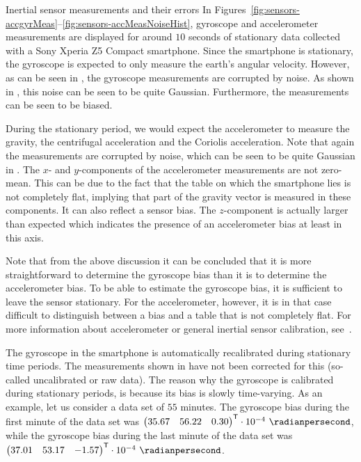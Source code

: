 \begin{myexample}{Inertial sensor measurements and their errors}%
\label{ex:sensors-inertialMeasurements}%
In Figures~\ref{fig:sensors-accgyrMeas}--\ref{fig:sensors-accMeasNoiseHist}, gyroscope and accelerometer measurements are displayed for around $10$ seconds of stationary data collected with a Sony Xperia Z5 Compact smartphone. Since the smartphone is stationary, the gyroscope is expected to only measure the earth's angular velocity. However, as can be seen in , the gyroscope measurements are corrupted by noise. As shown in , this noise can be seen to be quite Gaussian. Furthermore, the measurements can be seen to be biased. 

During the stationary period, we would expect the accelerometer to measure the gravity, the centrifugal acceleration and the Coriolis acceleration. Note that again the measurements are corrupted by noise, which can be seen to be quite Gaussian in . The $x$- and $y$-components of the accelerometer measurements are not zero-mean. This can be due to the fact that the table on which the smartphone lies is not completely flat, implying that part of the gravity vector is measured in these components. It can also reflect a sensor bias. The $z$-component is actually larger than expected which indicates the presence of an accelerometer bias at least in this axis. 

Note that from the above discussion it can be concluded that it is more straightforward to determine the gyroscope bias than it is to determine the accelerometer bias. To be able to estimate the gyroscope bias, it is sufficient to leave the sensor stationary. For the accelerometer, however, it is in that case difficult to distinguish between a bias and a table that is not completely flat. For more information about accelerometer or general inertial sensor calibration, see~\cite{tedaldiPM:2014,olssonKHS:2016,panahandehSJ:2010}. 

The gyroscope in the smartphone is automatically recalibrated during stationary time periods. The measurements shown in  have not been corrected for this (so-called uncalibrated or raw data). The reason why the gyroscope is calibrated during stationary periods, is because its bias is slowly time-varying. As an example, let us consider a data set of $55$ minutes. The gyroscope bias during the first minute of the data set was $\begin{pmatrix} 35.67 & 56.22 & 0.30 \end{pmatrix}^\Transp \cdot 10^{-4}~\radianpersecond$, while the gyroscope bias during the last minute of the data set was $\begin{pmatrix} 37.01 & 53.17 & -1.57 \end{pmatrix}^\Transp \cdot 10^{-4}~\radianpersecond$.


\end{myexample}
